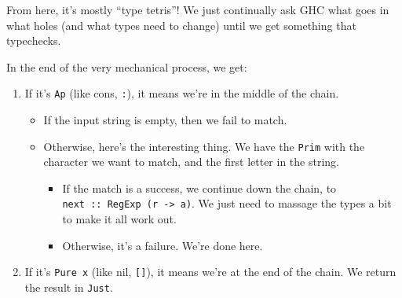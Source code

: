 \documentclass[]{article}
\newenvironment{Shaded}{}{}
\newcommand{\CommentTok}[1]{\textcolor[rgb]{0.38,0.63,0.69}{\textit{#1}}}
\newcommand{\DataTypeTok}[1]{\textcolor[rgb]{0.56,0.13,0.00}{#1}}
\newcommand{\FunctionTok}[1]{\textcolor[rgb]{0.02,0.16,0.49}{#1}}
\newcommand{\NormalTok}[1]{#1}
\newcommand{\OtherTok}[1]{\textcolor[rgb]{0.00,0.44,0.13}{#1}}
\begin{document}
From here, it's mostly ``type tetris''! We just continually ask GHC what goes in
what holes (and what types need to change) until we get something that
typechecks.

In the end of the very mechanical process, we get:

\begin{Shaded}
\end{Shaded}

\begin{enumerate}
\def\labelenumi{\arabic{enumi}.}
\item
  If it's \texttt{Ap} (like cons, \texttt{:}), it means we're in the middle of
  the chain.

  \begin{itemize}
  \tightlist
  \item
    If the input string is empty, then we fail to match.
  \item
    Otherwise, here's the interesting thing. We have the \texttt{Prim} with the
    character we want to match, and the first letter in the string.

    \begin{itemize}
    \tightlist
    \item
      If the match is a success, we continue down the chain, to
      \texttt{next\ ::\ RegExp\ (r\ -\textgreater{}\ a)}. We just need to
      massage the types a bit to make it all work out.
    \item
      Otherwise, it's a failure. We're done here.
    \end{itemize}
  \end{itemize}
\item
  If it's \texttt{Pure\ x} (like nil, \texttt{{[}{]}}), it means we're at the
  end of the chain. We return the result in \texttt{Just}.
\end{enumerate}
\end{document}
